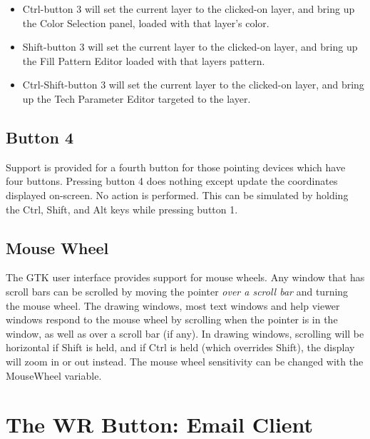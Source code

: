 \begin{itemize}
\item{{\kb Ctrl}-button 3 will set the current layer to the clicked-on
layer, and bring up the {\cb Color Selection} panel, loaded with that
layer's color.}

\item{{\kb Shift}-button 3 will set the current layer to the
clicked-on layer, and bring up the {\cb Fill Pattern Editor} loaded
with that layers pattern.}

\item{{\kb Ctrl-Shift}-button 3 will set the current layer to the
clicked-on layer, and bring up the {\cb Tech Parameter Editor}
targeted to the layer.}
\end{itemize}


\subsection{Button 4}

Support is provided for a fourth button for those pointing devices
which have four buttons.  Pressing button 4 does nothing except update
the coordinates displayed on-screen.  No action is performed.  This
can be simulated by holding the {\kb Ctrl}, {\kb Shift}, and {\kb Alt}
keys while pressing button 1.


\subsection{Mouse Wheel}

The GTK user interface provides support for mouse wheels.  Any window
that has scroll bars can be scrolled by moving the pointer {\it over a
scroll bar} and turning the mouse wheel.  The drawing windows, most
text windows and help viewer windows respond to the mouse wheel by
scrolling when the pointer is in the window, as well as over a scroll
bar (if any).  In drawing windows, scrolling will be horizontal if
{\kb Shift} is held, and if {\kb Ctrl} is held (which overrides {\kb
Shift}), the display will zoom in or out instead.  The mouse wheel
sensitivity can be changed with the {\et MouseWheel} variable.


\section{The {\cb WR} Button: Email Client}
\label{wrbutton}

